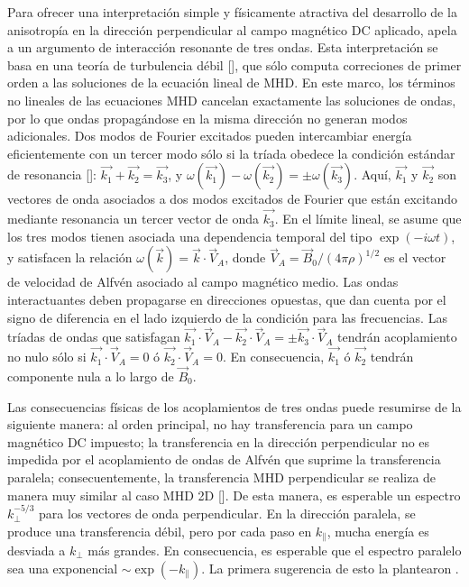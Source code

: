 Para ofrecer una interpretación simple y físicamente atractiva del
desarrollo de la anisotropía en la dirección perpendicular al campo
magnético DC aplicado, \cite{shebalin_anisotropy_1983} apela
a un argumento de interacción resonante de tres ondas. Esta
interpretación se basa en una teoría de turbulencia débil
[\cite{zakharov_kolmogorov_1992}], que sólo computa correciones de
primer orden a las soluciones de la ecuación lineal de MHD. En este
marco, los términos no lineales de las ecuaciones MHD cancelan
exactamente las soluciones de ondas, por lo que ondas propagándose en
la misma dirección no generan modos adicionales. Dos modos de Fourier
excitados pueden intercambiar energía eficientemente con un tercer
modo sólo si la tríada obedece la condición estándar de resonancia
[\cite{montgomery_anisotropic_1995}]: $\vec{k_1} + \vec{k_2} =
\vec{k_3}$, y $\omega(\vec{k_1}) - \omega(\vec{k_2}) = \pm
\omega(\vec{k_3})$. Aquí, $\vec{k_1}$ y $\vec{k_2}$ son vectores de
onda asociados a dos modos excitados de Fourier que están excitando
mediante resonancia un tercer vector de onda $\vec{k_3}$. En el límite
lineal, se asume que los tres modos tienen asociada una dependencia
temporal del tipo $\exp(-i\omega t)$, y satisfacen la relación
$\omega(\vec{k}) = \vec{k}\cdot\vec{V}_A$, donde $\vec{V}_A =
\vec{B}_0/(4\pi\rho)^{1/2}$ es el vector de velocidad de Alfv\'en
asociado al campo magnético medio. Las ondas interactuantes deben
propagarse en direcciones opuestas, que dan cuenta por el signo de
diferencia en el lado izquierdo de la condición para las
frecuencias. Las tríadas de ondas que satisfagan $\vec{k_1}\cdot
\vec{V}_A - \vec{k_2}\cdot \vec{V}_A = \pm \vec{k_3}\cdot \vec{V}_A$
tendrán acoplamiento no nulo sólo si $\vec{k_1}\cdot \vec{V}_A = 0$ ó
$\vec{k_2}\cdot \vec{V}_A = 0$. En consecuencia, $\vec{k_1}$ ó
$\vec{k_2}$ tendrán componente nula a lo largo de $\vec{B}_0$.

Las consecuencias físicas de los acoplamientos de tres ondas puede
resumirse de la siguiente manera: al orden principal, no hay
transferencia para un campo magnético DC impuesto; la transferencia en
la dirección perpendicular no es impedida por el acoplamiento de ondas
de Alfv\'en que suprime la transferencia paralela; consecuentemente,
la transferencia MHD perpendicular se realiza de manera muy similar al
caso MHD 2D [\cite{fyfe_dissipative_1977}]. De esta manera, es esperable
un espectro $k_\perp^{-5/3}$ para los vectores de onda
perpendicular. En la dirección paralela, se produce una transferencia
débil, pero por cada paso en $k_\parallel$, mucha energía es desviada
a $k_\perp$ más grandes. En consecuencia, es esperable que el espectro
paralelo sea una exponencial $\sim \exp(-k_\parallel)$. La primera
sugerencia de esto la plantearon \cite{montgomery_density_1987}.

